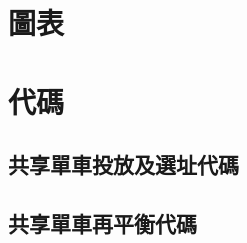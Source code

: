 \documentclass[12pt]{myClass}
\begin{document}

\newpage

\begin{appendices}
  \section{圖表}
  \label{appendix:graph}
  

\newpage
  \section{代碼}
  \subsection{共享單車投放及選址代碼}
  
  \subsection{共享單車再平衡代碼}
  
\end{appendices}
\end{document}
